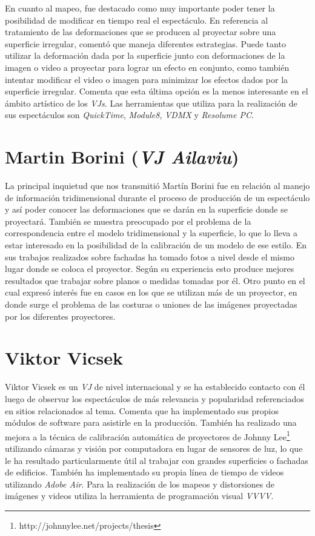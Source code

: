 En cuanto al mapeo, fue destacado como muy importante poder tener la posibilidad de modificar en tiempo real el espectáculo. En referencia al tratamiento de las deformaciones que se producen al proyectar sobre una superficie irregular, comentó que maneja diferentes estrategias. Puede tanto utilizar la deformación dada por la superficie junto con deformaciones de la imagen o video a proyectar para lograr un efecto en conjunto, como también intentar modificar el video o imagen para minimizar los efectos dados por la superficie irregular. Comenta que esta última opción es la menos interesante en el ámbito artístico de los \emph{VJs}. Las herramientas que utiliza para la realización de sus espectáculos son \emph{QuickTime}, \emph{Module8}, \emph{VDMX} y \emph{Resolume PC}.

\section{Martin Borini (\emph{VJ Ailaviu})}
La principal inquietud que nos transmitió Martín Borini\cite{Ailaviu} fue en relación al manejo de información tridimensional durante el proceso de producción de un espectáculo y así poder conocer las deformaciones que se darán en la superficie donde se proyectará. También se muestra preocupado por el problema de la correspondencia entre el modelo tridimensional y la superficie, lo que lo lleva a estar interesado en la posibilidad de la calibración de un modelo de ese estilo.
En sus trabajos realizados sobre fachadas ha tomado fotos a nivel desde el mismo lugar donde se coloca el proyector. Según su experiencia esto produce mejores resultados que trabajar sobre planos o medidas tomadas por él. Otro punto en el cual expresó interés fue en casos en los que se utilizan más de un proyector, en donde surge el problema de las costuras o uniones de las imágenes proyectadas por los diferentes proyectores.

\section{Viktor Vicsek}
Viktor Vicsek\cite{Viktorvicsek} es un \emph{VJ} de nivel internacional y se ha establecido contacto con él luego de observar los espectáculos de más relevancia y popularidad referenciados en sitios relacionados al tema. Comenta que ha implementado sus propios módulos de software para asistirle en la producción. También ha realizado una mejora a la técnica de calibración automática de proyectores de Johnny Lee\footnote{http://johnnylee.net/projects/thesis} utilizando cámaras y visión por computadora en lugar de sensores de luz, lo que le ha resultado particularmente útil al trabajar con grandes superficies o fachadas de edificios. También ha implementado su propia línea de tiempo de videos utilizando \emph{Adobe Air}. Para la realización de los mapeos y distorsiones de imágenes y videos utiliza la herramienta de programación visual \emph{VVVV}.

